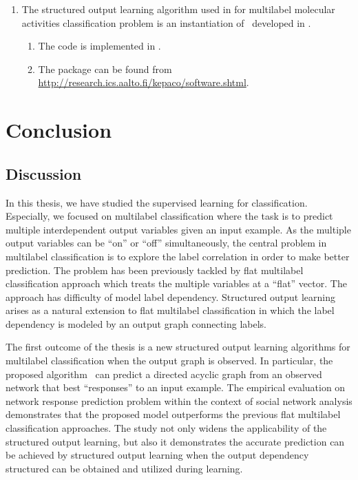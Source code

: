 {\begin{enumerate}
	\item The structured output learning algorithm used in  for multilabel molecular activities classification problem is an instantiation of \mmcrf\ developed in \citep{Rousu07}.
	\begin{enumerate}
		\item The code is implemented in \matlab.
		\item The package can be found from \url{http://research.ics.aalto.fi/kepaco/software.shtml}.
	\end{enumerate}
\end{enumerate}




%
%
\chapter{Conclusion} \label{ch_conclusion}


\section{Discussion}

In this thesis, we have studied the supervised learning for classification.
Especially, we focused on multilabel classification where the task is to predict multiple interdependent output variables given an input example.
As the multiple output variables can be ``on'' or ``off'' simultaneously, the central problem in multilabel classification is to explore the label correlation in order to make better prediction.
The problem has been previously tackled by flat multilabel classification approach which treats the multiple variables at a ``flat'' vector.
The approach has difficulty of model label dependency.
Structured output learning arises as a natural extension to flat multilabel classification in which the label dependency is modeled by an output graph connecting labels.

The first outcome of the thesis is a new structured output learning algorithms for multilabel classification when the output graph is observed.
In particular, the proposed algorithm \spin\ can predict a directed acyclic graph from an observed network that best ``responses'' to an input example.
The empirical evaluation on network response prediction problem within the context of social network analysis demonstrates that the proposed model outperforms the previous flat multilabel classification approaches.
The study not only widens the applicability of the structured output learning, but also it demonstrates the accurate prediction can be achieved by structured output learning when the output dependency structured can be obtained and utilized during learning.

}
